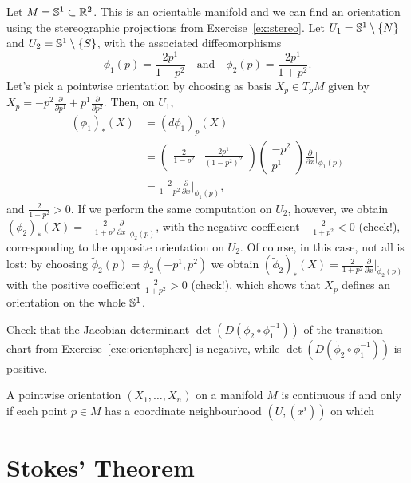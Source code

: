 \begin{example}\label{exe:orientsphere}
  Let $M = \mathbb{S}^1\subset \mathbb{R}^2$.
  This is an orientable manifold and we can find an orientation using the stereographic projections from Exercise~\ref{ex:stereo}.
  Let $U_1 = \mathbb{S}^1\setminus\{N\}$ and $U_2 = \mathbb{S}^1\setminus\{S\}$, with the associated diffeomorphisms
  \begin{equation}
    \phi_1(p) = \frac{2p^1}{1-p^2}
    \quad\mbox{and}\quad
    \phi_2(p) = \frac{2p^1}{1+p^2}.
  \end{equation}
  Let's pick a pointwise orientation by choosing as basis $X_p\in T_pM$ given by $X_p = -p^2 \frac{\partial}{\partial p^1} + p^1 \frac{\partial}{\partial p^2}$.
  Then, on $U_1$,
  \begin{align}
    (\phi_1)_*(X) &= (d\phi_1)_p(X) \\
    &= \left(\begin{smallmatrix}
      \frac{2}{1-p^2} & \frac{2p^1}{(1-p^2)^2}
    \end{smallmatrix}\right)
    \left(\begin{smallmatrix}
      -p^2 \\ p^1
    \end{smallmatrix}\right) \frac{\partial}{\partial x}\Big|_{\phi_1(p)}\\
    &= \frac{2}{1-p^2} \frac{\partial}{\partial x}\Big|_{\phi_1(p)},
  \end{align}
  and $\frac{2}{1-p^2}>0$.
  If we perform the same computation on $U_2$, however, we obtain $(\phi_2)_*(X) = -\frac{2}{1+p^2}\frac{\partial}{\partial x}\Big|_{\phi_2(p)}$, with the negative coefficient $-\frac{2}{1+p^2} < 0$ (check!), corresponding to the opposite orientation on $U_2$.
  Of course, in this case, not all is lost: by choosing $\widetilde\phi_2(p) = \phi_2(-p^1, p^2)$ we obtain $(\widetilde\phi_2)_*(X) = \frac{2}{1+p^2} \frac{\partial}{\partial x}\Big|_{\widetilde\phi_2(p)}$ with the positive coefficient $\frac{2}{1+p^2} > 0$ (check!), which shows that $X_p$ defines an orientation on the whole $\mathbb{S}^1$.
\end{example}

\begin{exercise}
  Check that the Jacobian determinant $\det(D(\phi_2\circ \phi_1^{-1}))$ of the transition chart from Exercise~\ref{exe:orientsphere} is negative, while $\det(D(\widetilde\phi_2\circ \phi_1^{-1}))$ is positive.
\end{exercise}

\begin{lemma}
  A pointwise orientation $(X_1, \ldots, X_n)$ on a manifold $M$ is continuous if and only if each point $p\in M$ has a coordinate neighbourhood $(U, (x^i))$ on which 
\end{lemma}






\section{Stokes' Theorem}
